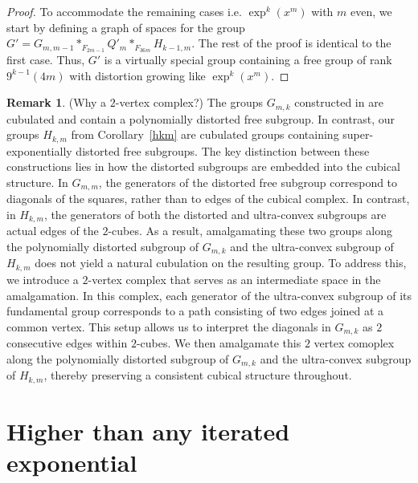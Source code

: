 \documentclass[oneside,11pt,reqno]{amsart}
\theoremstyle{definition}
\newtheorem{rem}[thm]{Remark}
\begin{document}
\begin{proof}
To accommodate the remaining cases i.e. $\exp^k(x^{m})$ with $m$ even, we start by defining a graph of spaces for the group $G'=G_{m,m-1} \ast_{F_{2m-1}} Q'_m \ast_{F_{36m}} H_{k-1,m}$. The rest of the proof is identical to the first case. Thus, $G'$ is a virtually special group containing a free group of rank $9^{k-1}(4m)$ with distortion growing like $\exp^k(x^{m})$.


\end{proof}

\begin{rem}\label{why} (Why a $2$-vertex complex?) 
The groups $G_{m,k}$ constructed in \cite{BS} are cubulated and contain a polynomially distorted free subgroup. In contrast, our groups $H_{k,m}$ from Corollary~\ref{hkm} are cubulated groups containing super-exponentially distorted free subgroups. The key distinction between these constructions lies in how the distorted subgroups are embedded into the cubical structure. In $G_{m,m}$, the generators of the distorted free subgroup correspond to diagonals of the squares, rather than to edges of the cubical complex. In contrast, in $H_{k,m}$, the generators of both the distorted and ultra-convex subgroups are actual edges of the $2$-cubes. As a result, amalgamating these two groups along the polynomially distorted subgroup of $G_{m,k}$ and the ultra-convex subgroup of $H_{k,m}$ does not yield a natural cubulation on the resulting group. To address this, we introduce a $2$-vertex complex that serves as an intermediate space in the amalgamation. In this complex, each generator of the ultra-convex subgroup of its fundamental group corresponds to a path consisting of two edges joined at a common vertex. This setup allows us to interpret the diagonals in $G_{m,k}$  as $2$ consecutive edges within $2$-cubes. We then amalgamate this $2$ vertex comoplex along the polynomially distorted subgroup of $G_{m,k}$ and the ultra-convex subgroup of $H_{k,m}$, thereby preserving a consistent cubical structure throughout.
\end{rem}


\section{Higher than any iterated exponential}\label{s8}
\end{document}

